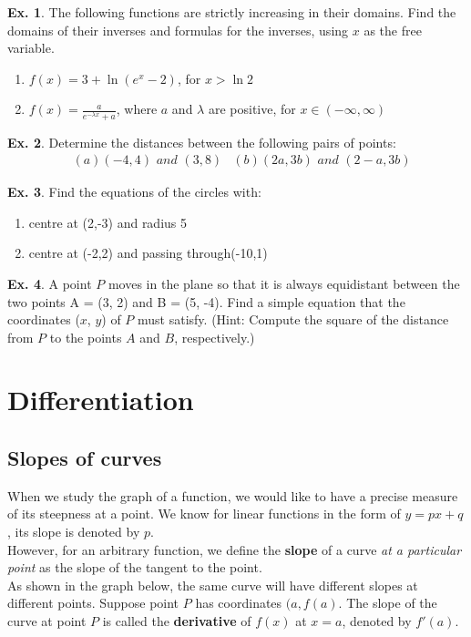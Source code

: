 \documentclass[10pt,a4paper]{book}
\theoremstyle{definition}\newtheorem{definition}{Definition}
\theoremstyle{definition}\newtheorem{fact}{Fact}
\theoremstyle{definition}\newtheorem{ex}{Ex.}
\theoremstyle{definition}\newtheorem{project}{Project}
\theoremstyle{definition}\newtheorem{problem}{Problem}
\theoremstyle{definition}\newtheorem{example}{Example}
\numberwithin{theorem}{chapter}
\numberwithin{corollary}{chapter}
\numberwithin{assumption}{chapter}
\numberwithin{definition}{chapter}
\numberwithin{prop}{chapter}
\numberwithin{notation}{chapter}
\numberwithin{problem}{chapter}
\numberwithin{example}{chapter}
\numberwithin{fact}{chapter}
\numberwithin{ex}{chapter}
\begin{document}
	\begin{ex}
		The following functions are strictly increasing in their domains. Find the domains of their inverses and formulas for the inverses, using $x$ as the free variable.
		\begin{enumerate}[label=(\alph*)]
			\item $f(x)=3+\ln(e^x -2)$, for $x>\ln2$
			\item $f(x) = \frac{a}{e^{-\lambda x}+a}$, where $a$ and $\lambda$ are positive, for $x \in (-\infty, \infty)$
		\end{enumerate}
	\end{ex}
	
	\begin{ex}
		Determine the distances between the following pairs of points:
		\begin{align*}
			& (a) (-4,4) \,\,and\,\, (3,8)     
			& (b) (2a,3b) \,\,and\,\, (2-a,3b) 
		\end{align*}
	\end{ex}
	
	\begin{ex}
		Find the equations of the circles with:
		\begin{enumerate}[label=(\alph*)]
			\item centre at (2,-3) and radius 5
			\item centre at (-2,2) and passing through(-10,1)
		\end{enumerate}
	\end{ex}
	
	\begin{ex}
		A point $P$ moves in the plane so that it is always equidistant between the two points A = (3, 2) and B = (5, -4). Find a simple equation that the coordinates ($x$, $y$) of $P$ must satisfy. (Hint: Compute the square of the distance from $P$ to the points $A$ and $B$, respectively.)
	\end{ex}
	
	
	\chapter{Differentiation}
	
	\section{Slopes of curves}
	
	When we study the graph of a function, we would like to have a precise measure of its steepness at a point. We know for linear functions in the form of $y=px+q$, its slope is denoted by $p$.
	\\
	However, for an arbitrary function, we define the \textbf{slope} of a curve \textit{at a particular point} as the slope of the tangent to the point.
	\\
	As shown in the graph below, the same curve will have different slopes at different points. Suppose point $P$ has coordinates $(a,f(a)$. The slope of the curve at point $P$ is called the \textbf{derivative} of $f(x)$ at $x=a$, denoted by $f'(a)$.
	
\end{document}
